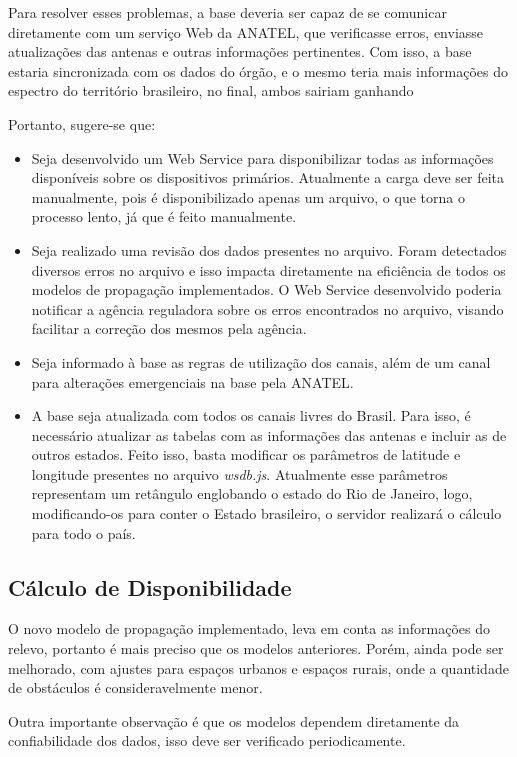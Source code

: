 Para resolver esses problemas, a base deveria ser capaz de se comunicar diretamente com um serviço Web da ANATEL, que verificasse erros, enviasse atualizações das antenas e outras informações pertinentes. Com isso, a base estaria sincronizada com os dados do órgão, e o mesmo teria mais informações do espectro do território brasileiro, no final, ambos sairiam ganhando

Portanto, sugere-se que:

\begin{itemize}
\item Seja desenvolvido um Web Service para disponibilizar todas as informações disponíveis sobre os dispositivos primários. Atualmente a carga deve ser feita manualmente, pois é disponibilizado apenas um arquivo, o que torna o processo lento, já que é feito manualmente.
\item Seja realizado uma revisão dos dados presentes no arquivo. Foram detectados diversos erros no arquivo e isso impacta diretamente na eficiência de todos os modelos de propagação implementados. O Web Service desenvolvido poderia notificar a agência reguladora sobre os erros encontrados no arquivo, visando facilitar a correção dos mesmos pela agência.
\item Seja informado à base as regras de utilização dos canais, além de um canal para alterações emergenciais na base pela ANATEL.
\item A base seja atualizada com todos os canais livres do Brasil. Para isso, é necessário atualizar as tabelas com as informações das antenas e incluir as de outros estados. Feito isso, basta modificar os parâmetros de latitude e longitude presentes no arquivo \textit{wsdb.js}. Atualmente esse parâmetros representam um retângulo englobando o estado do Rio de Janeiro, logo, modificando-os para conter o Estado brasileiro, o servidor realizará o cálculo para todo o país.
\end{itemize}


\subsection{Cálculo de Disponibilidade}

O novo modelo de propagação implementado, leva em conta as informações do relevo, portanto é mais preciso que os modelos anteriores. Porém, ainda pode ser melhorado, com ajustes para espaços urbanos e espaços rurais, onde a quantidade de obstáculos é consideravelmente menor.

Outra importante observação é que os modelos dependem diretamente da confiabilidade dos dados, isso deve ser verificado periodicamente.

